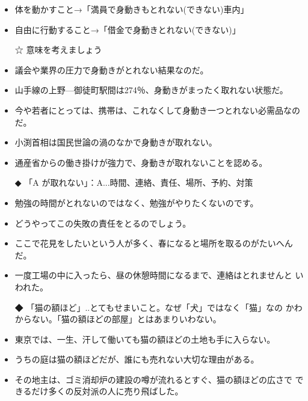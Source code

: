 \documentclass[
uplatex,
b5paper,
10pt,
dvipdfmx
]{jsbook}
\begin{document}
\begin{enumerate}
\begin{itemize}
\item 体を動かすこと→「満員で身動きもとれない(できない)車内」
\item 自由に行動すること→「借金で身動きとれない(できない)」
\end{itemize}

\begin{itemize}
\item[☆] 意味を考えましょう
\end{itemize}

\begin{itemize}
\item 議会や業界の圧力で身動きがとれない結果なのだ。
\item 山手線の上野—御徒町駅間は274％、身動きがまったく取れない状態だ。
\item 今や若者にとっては、携帯は、これなくして身動き一つとれない必需品なのだ。
\item 小渕首相は国民世論の渦のなかで身動きが取れない。
\item 通産省からの働き掛けが強力で、身動きが取れないことを認める。
\end{itemize}

\begin{itemize}
\item[◆] 「A が取れない」：A...時間、連絡、責任、場所、予約、対策
\end{itemize}
\begin{itemize}
\item 勉強の時間がとれないのではなく、勉強がやりたくないのです。
\item どうやってこの失敗の責任をとるのでしょう。
\item ここで花見をしたいという人が多く、春になると場所を取るのがたいへん
      だ。
\item 一度工場の中に入ったら、昼の休憩時間になるまで、連絡はとれませんと
      いわれた。
\end{itemize}

\begin{itemize}
\item[◆] 「猫の額ほど」..とてもせまいこと。なぜ「犬」ではなく「猫」なの
	  かわからない。「猫の額ほどの部屋」とはあまりいわない。
\end{itemize}

\begin{itemize}
\item 東京では、一生、汗して働いても猫の額ほどの土地も手に入らない。
\item うちの庭は猫の額ほどだが、誰にも売れない大切な理由がある。
\item その地主は、ゴミ消却炉の建設の噂が流れるとすぐ、猫の額ほどの広さで
      できるだけ多くの反対派の人に売り飛ばした。
\end{itemize}



\end{enumerate}
\end{document}
